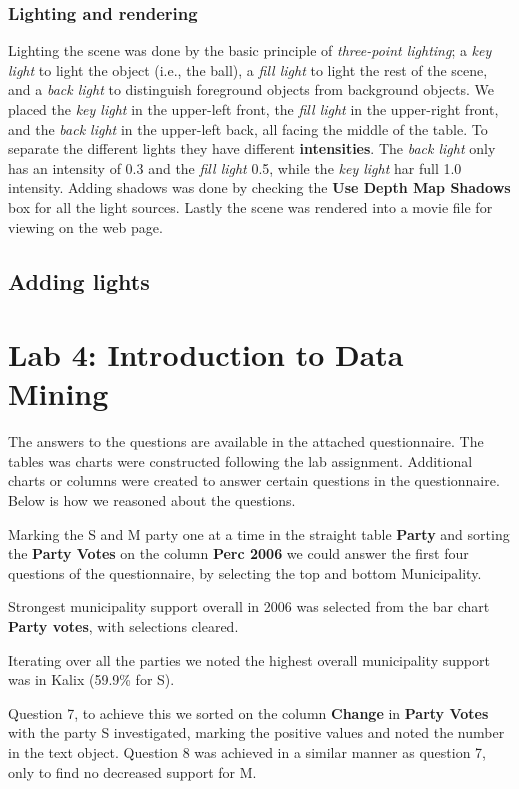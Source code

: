 \documentclass[a4paper]{article}
\begin{document}
\subsubsection{Lighting and rendering}
Lighting the scene was done by the basic principle of \textit{three-point
lighting}; a \textit{key light} to light the object (i.e., the ball), a
\textit{fill light} to light the rest of the scene, and a \textit{back light} to
distinguish foreground objects from background objects. We placed the
\textit{key light} in the upper-left front, the \textit{fill light} in the
upper-right front, and the \textit{back light} in the upper-left back, all
facing the middle of the table. To separate the different lights they have
different \textbf{intensities}. The \textit{back light} only has an intensity of
0.3 and the \textit{fill light} 0.5, while the \textit{key light} har full 1.0
intensity. Adding shadows was done by checking the \textbf{Use Depth Map
Shadows} box for all the light sources. Lastly the scene was rendered into a
movie file for viewing on the web page.

\subsection{Adding lights} %
\newpage
\section{Lab 4: Introduction to Data Mining}
The answers to the questions are available in the attached questionnaire. The
tables was charts were constructed following the lab assignment. Additional
charts or columns were created to answer certain questions in the questionnaire.
Below is how we reasoned about the questions.

Marking the S and M party one at a time in the straight table \textbf{Party} and
sorting the \textbf{Party Votes} on the column \textbf{Perc 2006} we could
answer the first four questions of the questionnaire, by selecting the top and
bottom Municipality.

Strongest municipality support overall in 2006 was selected from the bar chart
\textbf{Party votes}, with selections cleared.

Iterating over all the parties we noted the highest overall municipality support
was in Kalix (59.9\% for S).

Question 7, to achieve this we sorted on the column \textbf{Change} in
\textbf{Party Votes} with the party S investigated, marking the positive values
and noted the number in the text object.  Question 8 was achieved in a similar
manner as question 7, only to find no decreased support for M.
\end{document}
